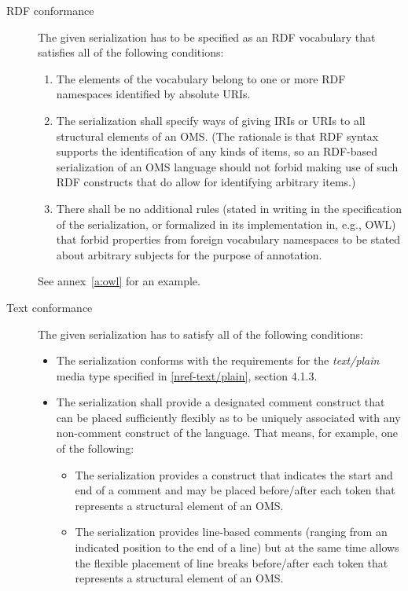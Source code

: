 \documentclass[10pt, a4paper]{isov2}
\makeatletter
\newcommand*{\eg}{e.g.\@\xspace}
\newcommand*\CommentAuthor{}
\renewcommand*\CommentAuthor{#1}}
\newcommand*\CommentDate{}
\renewcommand*\CommentDate{#1}}
\newcommand*\CommentId{}
\renewcommand*\CommentId{#1}}
\newcommand*\CommentType{}
\renewcommand*\CommentType{#1}}
\newcommand*{\SetCommentColorByType}[1]{%
\edef\localType{{#1}}%
\expandafter\ifstrequal\localType{q-aut}{\colorlet{CommentColor}{red}}{%
\expandafter\ifstrequal\localType{q-all}{\colorlet{CommentColor}{orange}}{%
\expandafter\ifstrequal\localType{todo}{\colorlet{CommentColor}{orange}}{%
\expandafter\ifstrequal\localType{fyi}{\colorlet{CommentColor}{lightgray}}{%
\colorlet{CommentColor}{yellow}}}}}}
\newcommand*{\SetCommentPrefixByType}[1]{%
\edef\localType{{#1}}%
\expandafter\@ifmtarg\localType{%
\edef\CommentPrefix{}%
}{%
\caseupper[q]{#1}%
\edef\CommentPrefix{\thestring: }%
}}
\newcommand*{\initComment}[1]{%
\setkeys{Comment}{#1}%
\SetCommentColorByType{\CommentType}%
\relax%
\SetCommentPrefixByType{\CommentType}%
\relax%
}
\newcommand*{\todonote}[2][]{%
\initComment{#1}%
\pdfcomment[author=\CommentAuthor,color=CommentColor,date=\CommentDate,id=\CommentId]{%
\CommentPrefix
#2}}
\renewcommand*{\todonote}[2][]{%
\initComment{#1}%
\ednote{\CommentPrefix #2}}
\newcommand*{\mimetype}[1]{\textit{#1}}
\renewcommand{\noterefname}{note}
\renewcommand{\nref}[1]{\noterefname~\ref{#1}}
\renewcommand{\nref}[1]{\ref{nref-#1}}
\makeatother
\begin{document}
\begin{description}
\item[RDF conformance]
The given serialization has to be specified as an RDF vocabulary that
 satisfies all of the following conditions:
 \begin{enumerate} 
\item The elements of the vocabulary belong to one or more RDF namespaces
 identified by absolute URIs.
\item\label{it:ids-for-structure} The serialization shall specify ways of giving IRIs or URIs to all structural elements of an OMS. (The  rationale is that RDF syntax supports the identification of any kinds of items, so an RDF-based serialization of an OMS language should not forbid making use of such RDF constructs that do allow for identifying arbitrary items.)
\item There shall be no additional rules (stated in writing in the specification of the serialization, or formalized in its implementation in, e.g., OWL) that forbid properties from foreign vocabulary namespaces to be stated about arbitrary subjects for the purpose of annotation.
 \end{enumerate} 

See annex~\ref{a:owl} for an example.


\item[Text conformance]
The given serialization has to satisfy all of the following conditions:
 \begin{itemize} 
\item The serialization conforms with the requirements for the \mimetype{text/plain} media type specified in \nref{text/plain}, section 4.1.3.
\item The serialization shall provide a designated comment construct that can be placed sufficiently flexibly as to be uniquely associated with any non-comment construct of the language.  That means, for example, one of the following:
   \begin{itemize} 
  \item The serialization provides a construct that indicates the start and end of a comment and may be placed before/after each token that represents a structural element of an OMS.
  \item The serialization provides line-based comments (ranging from an indicated position to the end of a line) but at the same time allows the flexible placement of line breaks before/after each token that represents a structural element of an OMS.
   \end{itemize} 
 \end{itemize} 


\end{description}
\end{document}
